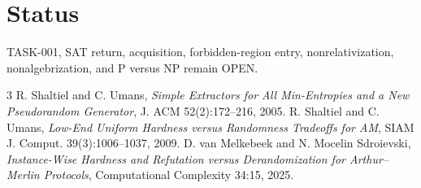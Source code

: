 \documentclass[11pt]{article}
\begin{document}
\section*{Status}
TASK-001, SAT return, acquisition, forbidden-region entry, nonrelativization, nonalgebrization, and P versus NP remain OPEN.
\begin{thebibliography}{3}
 R. Shaltiel and C. Umans, \emph{Simple Extractors for All Min-Entropies and a New Pseudorandom Generator}, J. ACM 52(2):172--216, 2005.
 R. Shaltiel and C. Umans, \emph{Low-End Uniform Hardness versus Randomness Tradeoffs for AM}, SIAM J. Comput. 39(3):1006--1037, 2009.
 D. van Melkebeek and N. Mocelin Sdroievski, \emph{Instance-Wise Hardness and Refutation versus Derandomization for Arthur--Merlin Protocols}, Computational Complexity 34:15, 2025.
\end{thebibliography}
\end{document}
